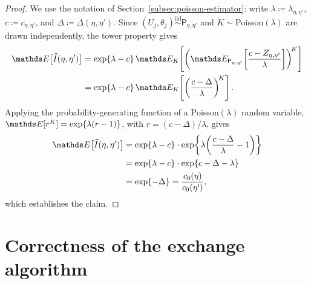 \begin{proof}
We use the notation of Section~\ref{subsec:poisson-estimator}: write $\lambda \coloneqq \lambda_{\eta,\eta'}$, $c \coloneqq c_{\eta,\eta'}$, and $\Delta \coloneqq \Delta(\eta,\eta')$.
Since $(U_j, \theta_j) \overset{\mathrm{iid}}{\sim} \mathsf{P}_{\eta,\eta'}$ and $K \sim \mathrm{Poisson}(\lambda)$ are drawn independently, the tower property gives
\begin{align}
    \bE\bigl[\widehat{I}(\eta,\eta')\bigr]
    &= \exp\{\lambda - c\}\,
    \bE_K\!\left[
        \left(
            \bE_{\mathsf{P}_{\eta,\eta'}}
            \!\left[\frac{c - Z_{\eta,\eta'}}{\lambda}\right]
        \right)^{\!K}
    \right] \\
    &= \exp\{\lambda - c\}\,
    \bE_K\!\left[\left(\frac{c - \Delta}{\lambda}\right)^{\!K}\right].
\end{align}
Applying the probability-generating function of a $\mathrm{Poisson}(\lambda)$ random variable, $\bE[r^K] = \exp\{\lambda(r-1)\}$, with $r = (c - \Delta)/\lambda$, gives
\begin{align}
    \bE\bigl[\widehat{I}(\eta,\eta')\bigr]
    &= \exp\{\lambda - c\}
    \cdot
    \exp\!\left\{\lambda\!\left(\frac{c - \Delta}{\lambda} - 1\right)\right\} \\
    &= \exp\{\lambda - c\}
    \cdot \exp\{c - \Delta - \lambda\} \\
    &= \exp\{-\Delta\}
    = \frac{c_0(\eta)}{c_0(\eta')},
\end{align}
which establishes the claim.
\end{proof}

\section{Correctness of the exchange algorithm}
\label{proof:exchange-correctness}

